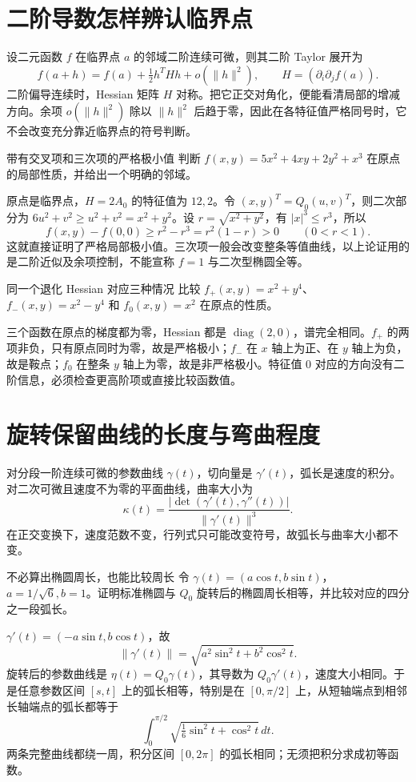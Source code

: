 \section{二阶导数怎样辨认临界点}

设二元函数 $f$ 在临界点 $a$ 的邻域二阶连续可微，则其二阶 Taylor 展开为
\[
f(a+h)=f(a)+\tfrac12h^THh+o(\|h\|^2),
\qquad H=(\partial_i\partial_j f(a)).
\]
二阶偏导连续时，Hessian 矩阵 $H$ 对称。把它正交对角化，便能看清局部的增减方向。余项 $o(\|h\|^2)$ 除以 $\|h\|^2$ 后趋于零，因此在各特征值严格同号时，它不会改变充分靠近临界点的符号判断。

\begin{example}{带有交叉项和三次项的严格极小值}
判断 $f(x,y)=5x^2+4xy+2y^2+x^3$ 在原点的局部性质，并给出一个明确的邻域。
\end{example}
\begin{solution}
原点是临界点，$H=2A_0$ 的特征值为 $12,2$。令 $(x,y)^T=Q_0(u,v)^T$，则二次部分为 $6u^2+v^2\ge u^2+v^2=x^2+y^2$。设 $r=\sqrt{x^2+y^2}$，有 $|x|^3\le r^3$，所以
\[
f(x,y)-f(0,0)\ge r^2-r^3=r^2(1-r)>0\qquad (0<r<1).
\]
这就直接证明了严格局部极小值。三次项一般会改变整条等值曲线，以上论证用的是二阶近似及余项控制，不能宣称 $f=1$ 与二次型椭圆全等。
\end{solution}

\begin{example}{同一个退化 Hessian 对应三种情况}
比较 $f_+(x,y)=x^2+y^4$、$f_-(x,y)=x^2-y^4$ 和 $f_0(x,y)=x^2$ 在原点的性质。
\end{example}
\begin{solution}
三个函数在原点的梯度都为零，Hessian 都是 $\operatorname{diag}(2,0)$，谱完全相同。$f_+$ 的两项非负，只有原点同时为零，故是严格极小；$f_-$ 在 $x$ 轴上为正、在 $y$ 轴上为负，故是鞍点；$f_0$ 在整条 $y$ 轴上为零，故是非严格极小。特征值 $0$ 对应的方向没有二阶信息，必须检查更高阶项或直接比较函数值。
\end{solution}

\section{旋转保留曲线的长度与弯曲程度}

对分段一阶连续可微的参数曲线 $\gamma(t)$，切向量是 $\gamma'(t)$，弧长是速度的积分。对二次可微且速度不为零的平面曲线，曲率大小为
\[
\kappa(t)=\frac{|\det(\gamma'(t),\gamma''(t))|}{\|\gamma'(t)\|^3}.
\]
在正交变换下，速度范数不变，行列式只可能改变符号，故弧长与曲率大小都不变。

\begin{example}{不必算出椭圆周长，也能比较周长}
令 $\gamma(t)=(a\cos t,b\sin t)$，$a=1/\sqrt6,b=1$。证明标准椭圆与 $Q_0$ 旋转后的椭圆周长相等，并比较对应的四分之一段弧长。
\end{example}
\begin{solution}
$\gamma'(t)=(-a\sin t,b\cos t)$，故
\[
\|\gamma'(t)\|=\sqrt{a^2\sin^2t+b^2\cos^2t}.
\]
旋转后的参数曲线是 $\eta(t)=Q_0\gamma(t)$，其导数为 $Q_0\gamma'(t)$，速度大小相同。于是任意参数区间 $[s,t]$ 上的弧长相等，特别是在 $[0,\pi/2]$ 上，从短轴端点到相邻长轴端点的弧长都等于
\[
\int_0^{\pi/2}\sqrt{\tfrac16\sin^2t+\cos^2t}\,dt.
\]
两条完整曲线都绕一周，积分区间 $[0,2\pi]$ 的弧长相同；无须把积分求成初等函数。
\end{solution}

